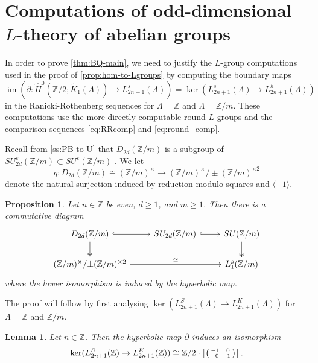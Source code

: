 \documentclass[11pt,a4paper,leqno]{amsart}
\newtheorem{proposition}[theorem]{Proposition}
\newtheorem{lemma}[theorem]{Lemma}
\theoremstyle{definition}
\theoremstyle{remark}
\newcommand{\cy}[1]{\Z/{#1}}
\newcommand{\Z}{\mathbb{Z}}
\DeclareMathOperator{\IM}{im}
\renewcommand{\l}{\Lambda}
\newcommand{\La}{\Lambda}
\newcommand{\wK}{\widetilde K}
\newcommand{\bZ}{\mathbb Z}
\newcommand{\wH}{\widehat H}
\newcommand{\bd}{\partial}
\newcommand{\la}{\langle}
\newcommand{\ra}{\rangle}
\newcommand{\sx}{\hphantom{x}}
\newcommand{\SU}{SU^{\varepsilon}}
\begin{document}
\section{Computations of odd-dimensional $L$-theory of abelian groups}
\label{ss:L-theory-computations}
In order to prove \cref{thm:BQ-main}, we need to justify the $L$-group computations used in the proof of
\cref{prop:hom-to-Lgroups} by computing the boundary maps
$$\IM(\bd \colon \wH^0(\cy 2; \wK_1(\La)) \to L^s_{2n +1}(\La)) = \ker(L_{2n+1}^s(\l) \to L_{2n+1}^h(\l))$$
in the Ranicki-Rothenberg sequences for $\La = \bZ$ and $\La = \cy m$. These computations use the more directly computable round $L$-groups and the comparison sequences \eqref{eq:RRcomp} and \eqref{eq:round_comp}.

Recall  from \cref{ss:PB-to-U}
that $D_{2d}(\cy m)$ is a subgroup of $\SU_{2d}(\cy m) \subset \SU(\cy m)$ . We  let 
$$q\colon D_{2d}(\cy m) \cong (\cy m)^\times \to (\cy m)^\times/ \pm(\cy m)^{\times 2}$$
denote the natural surjection induced by     reduction modulo squares and $\la -1\ra$.
\begin{proposition} \label{prop:Lgroups-main} Let $n \in \Z$ be even, $d \geq 1$, and $m \ge 1$. Then there is a commutative diagram
\[
\begin{tikzcd}
	D_{2d}(\cy m) \ar[r,hookrightarrow] \ar[d,twoheadrightarrow] & SU_{2d}(\cy m) \ar[r,hookrightarrow] & SU(\cy m) \ar[d,twoheadrightarrow] \\
	 {(\Z/ m)^\times}/{\pm(\Z/ m)^{\times 2}} \ar[rr,"\cong"] & & L_1^s(\cy m)
\end{tikzcd}
\]
where the lower isomorphism is induced by the hyperbolic map.
\end{proposition}

The proof will follow by first analysing $\ker(L_{2n+1}^S(\l) \to L_{2n+1}^K(\l))$ for $\l = \Z$ and $\Z/m$.


\begin{lemma} \label{lemma:L_1(Z)}
Let $n \in \Z$. Then the hyperbolic map $\bd$ induces an isomorphism
 \[ \ker(L_{2n+1}^S(\Z) \to L_{2n+1}^K(\Z)) \cong  \Z/2 \cdot \left[ \left(\begin{smallmatrix} -1 &\sx 0 \\ \sx 0 & -1 \end{smallmatrix}\right) \right]. \]
\end{lemma}
\end{document}
